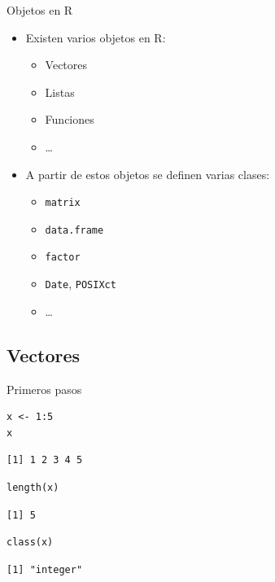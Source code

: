 \documentclass[xcolor={usenames,svgnames,dvipsnames}]{beamer}
\begin{document}
\begin{frame}[fragile,label={sec:org33c73b1}]{Objetos en R}
 \begin{itemize}
\item Existen varios objetos en R:
\begin{itemize}
\item Vectores
\item Listas
\item Funciones
\item \ldots{}
\end{itemize}
\item A partir de estos objetos se definen varias clases:
\begin{itemize}
\item \texttt{matrix}
\item \texttt{data.frame}
\item \texttt{factor}
\item \texttt{Date}, \texttt{POSIXct}
\item \ldots{}
\end{itemize}
\end{itemize}
\end{frame}

\subsection{Vectores}
\label{sec:org0d43ef7}

\begin{frame}[fragile,label={sec:org5f70d74}]{Primeros pasos}
 \lstset{language=r,label= ,caption= ,captionpos=b,numbers=none}
\begin{lstlisting}
x <- 1:5
x
\end{lstlisting}

\begin{verbatim}
[1] 1 2 3 4 5
\end{verbatim}

\lstset{language=r,label= ,caption= ,captionpos=b,numbers=none}
\begin{lstlisting}
length(x)
\end{lstlisting}

\begin{verbatim}
[1] 5
\end{verbatim}

\lstset{language=r,label= ,caption= ,captionpos=b,numbers=none}
\begin{lstlisting}
class(x)
\end{lstlisting}

\begin{verbatim}
[1] "integer"
\end{verbatim}
\end{frame}
\end{document}
